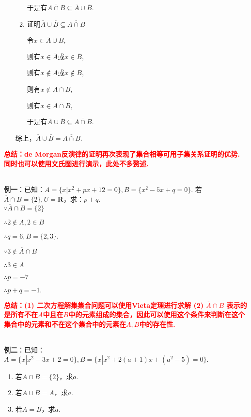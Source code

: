 \documentclass[8pt]{article}
\begin{document}
\begin{enumerate}[label=(\arabic*)]
\begin{enumerate}[label=$\arabic*^{\circ}$]
								于是有$\overline{A\cap B}\subseteq\overline{A}\cup\overline{B}$.

							\item 证明$\overline{A}\cup\overline{B}\subseteq\overline{A\cap B}$

								令$x\in\overline{A}\cup\overline{B},$

								则有$x\in\overline{A}$或$x\in\overline{B},$

								则有$x\notin A$或$x\notin B,$

								则有$x\notin A\cap B,$

								则有$x\in \overline{A\cap B},$

								于是有$\overline{A}\cup\overline{B}\subseteq\overline{A\cap B}$.

						\end{enumerate}

						综上，$\overline{A}\cup\overline{B}=\overline{A\cap B}$.

				\end{enumerate}

				\textcolor{red}{\textbf{总结：de Morgan反演律的证明再次表现了集合相等可用子集关系证明的优势. 同时也可以使用文氏图进行演示，此处不多赘述.}}

				~\\

				\textbf{例一}：已知：$A=\{x|x^2+px+12=0\}, B=\{x^2-5x+q=0\}.$ 若$\overline{A} \cap B=\{2\}, U=\mathbf{R}$，求：$p+q$.
				~\\

				$\because \overline{A} \cap B=\{2\}$

				$\therefore 2\notin A, 2\in B$

				$\therefore q=6, B=\{2,3\}.$

				$\because 3\notin \overline{A} \cap B$

				$\therefore 3\in A$

				$\therefore p=-7$

				$\therefore p+q=-1.$

				\textcolor{red}{\textbf{总结：(1) 二次方程解集集合问题可以使用Vieta定理进行求解 (2) $\overline{A} \cap B$ 表示的是所有不在$A$中且在$B$中的元素组成的集合，因此可以使用这个条件来判断在这个集合中的元素和不在这个集合中的元素在$A, B$中的存在性.}}

				~\\

				\textbf{例二}：已知：$A=\{x|x^2-3x+2=0\}, B=\{x|x^2+2(a+1)x+(a^2-5)=0\}.$

				\begin{enumerate}[label=(\arabic*)]
					\item 若$A\cap B=\{2\}$，求$a$.
					\item 若$A\cup B=A$，求$a$.
					\item 若$A=B$，求$a$.
				\end{enumerate}
\end{document}
